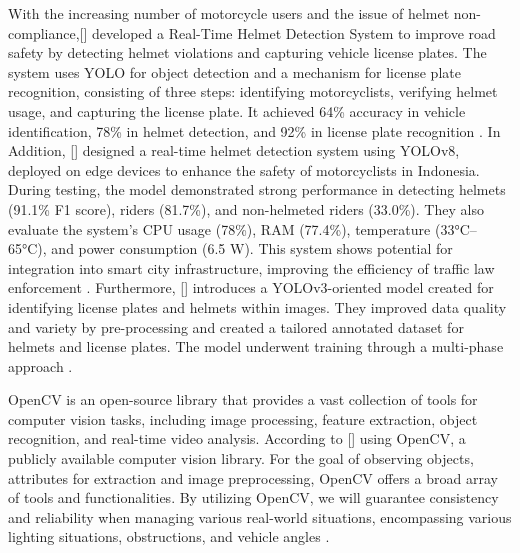 \begin{refsection}
With the increasing number of motorcycle users and the issue of helmet non-compliance,\citeauthor{kumar2024realtime}[\citeyear{kumar2024realtime}] developed a Real-Time Helmet Detection System to improve road safety by detecting helmet violations and capturing vehicle license plates. The system uses YOLO for object detection and a mechanism for license plate recognition, consisting of three steps: identifying motorcyclists, verifying helmet usage, and capturing the license plate. It achieved 64\% accuracy in vehicle identification, 78\% in helmet detection, and 92\% in license plate recognition \cite{kumar2024realtime}. In Addition, \citeauthor{muhammad2024helmet} [\citeyear{muhammad2024helmet}] designed a real-time helmet detection system using YOLOv8, deployed on edge devices to enhance the safety of motorcyclists in Indonesia. During testing, the model demonstrated strong performance in detecting helmets (91.1\% F1 score), riders (81.7\%), and non-helmeted riders (33.0\%). They also evaluate the system’s CPU usage (78\%), RAM (77.4\%), temperature (33°C–65°C), and power consumption (6.5 W). This system shows potential for integration into smart city infrastructure, improving the efficiency of traffic law enforcement \cite {muhammad2024helmet}. Furthermore,\citeauthor{choubey2025helmet} [\citeyear{choubey2025helmet}] introduces a YOLOv3-oriented model created for identifying license plates and helmets within images. They improved data quality and variety by pre-processing and created a tailored annotated dataset for helmets and license plates. The model underwent training through a multi-phase approach \cite{choubey2025helmet}.

OpenCV is an open-source library that provides a vast collection of tools for computer vision tasks, including image processing, feature extraction, object recognition, and real-time video analysis. According to \citeauthor{satheesh2024automated} [\citeyear{satheesh2024automated}] using OpenCV, a publicly available computer vision library. For the goal of observing objects, attributes for extraction and image preprocessing, OpenCV offers a broad array of tools and functionalities. By utilizing OpenCV, we will guarantee consistency and reliability when managing various real-world situations, encompassing various lighting situations, obstructions, and vehicle angles \cite{satheesh2024automated}.


\end{refsection}
